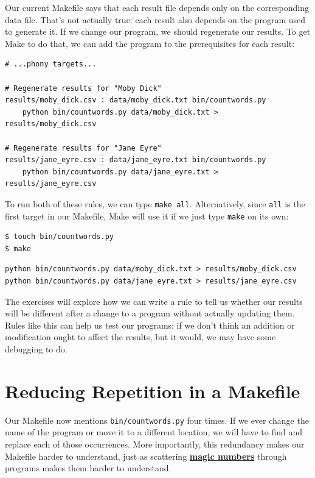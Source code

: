 \documentclass[
]{krantz}
\newcommand{\gref}[2]{\hyperlink{#2}{\textbf{#1}}}
\begin{document}
Our current Makefile says that each result file depends only on the corresponding data file.
That's not actually true:
each result also depends on the program used to generate it.
If we change our program,
we should regenerate our results.
To get Make to do that,
we can add the program to the prerequisites for each result:

\begin{verbatim}
# ...phony targets...

# Regenerate results for "Moby Dick"
results/moby_dick.csv : data/moby_dick.txt bin/countwords.py
    python bin/countwords.py data/moby_dick.txt > results/moby_dick.csv

# Regenerate results for "Jane Eyre"
results/jane_eyre.csv : data/jane_eyre.txt bin/countwords.py
    python bin/countwords.py data/jane_eyre.txt > results/jane_eyre.csv
\end{verbatim}

To run both of these rules,
we can type \texttt{make\ all}.
Alternatively,
since \texttt{all} is the first target in our Makefile,
Make will use it if we just type \texttt{make} on its own:

\begin{verbatim}
$ touch bin/countwords.py
$ make
\end{verbatim}

\begin{verbatim}
python bin/countwords.py data/moby_dick.txt > results/moby_dick.csv
python bin/countwords.py data/jane_eyre.txt > results/jane_eyre.csv
\end{verbatim}

The exercises will explore how we can write a rule
to tell us whether our results will be different
after a change to a program
without actually updating them.
Rules like this can help us test our programs:
if we don't think an addition or modification ought to affect the results,
but it would,
we may have some debugging to do.

\hypertarget{automate-variables}{%
\section{Reducing Repetition in a Makefile}\label{automate-variables}}

Our Makefile now mentions \texttt{bin/countwords.py} four times.
If we ever change the name of the program or move it to a different location,
we will have to find and replace each of those occurrences.
More importantly,
this redundancy makes our Makefile harder to understand,
just as scattering \gref{magic numbers}{magic\_number} through programs
makes them harder to understand.
\end{document}
